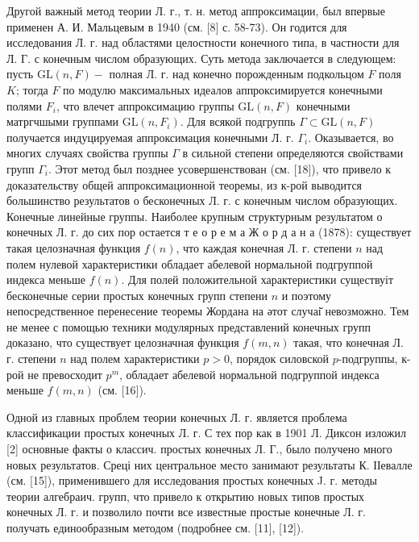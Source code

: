 \documentclass[10pt]{article}
\begin{document}
Другой важный метод теории Л. г., т. н. метод аппроксимации, был впервые применен А. И. Мальцевым в 1940 (см. [8] с. 58-73). Он годится для исследования Л. г. над областями целостности конечного типа, в частности для Л. Г. с конечным числом образующих. Суть метода заключается в следующем: пусть $\mathrm{GL}(n, F)-$ полная Л. г. над конечно порожденным подкольцом $F$ поля $K$; тогда $F$ по модулю максимальных идеалов аппроксимируется конечными полями $F_{i}$, что влечет аппроксимацию группы $\mathrm{GL}(n, F)$ конечными матргчшыми группами $\mathrm{GL}\left(n, F_{i}\right)$. Для всякой подгруппь $\Gamma \subset \mathrm{GL}(n, F)$ получается индуцируемая аппроксимация конечными Л. г. $\Gamma_{i}$. Оказывается, во многих случаях свойства группы $\Gamma$ в сильной степени определяются свойствами групп $\Gamma_{i}$. Этот метод был позднее усовершенствован (см. [18]), что привело к доказательству общей аппроксимационной теоремы, из к-рой выводится большинство результатов о бесконечных Л. г. с конечным числом образующих. Конечные линейные группы. Наиболее крупным структурным результатом о конечных Л. г. до сих пор остается т е о р е м а Ж о р д а н а (1878): существует такая целозначная функция $f(n)$, что каждая конечная Л. г. степени $n$ над полем нулевой характеристики обладает абелевой нормальной подгруппой индекса меньше $f(n)$. Для полей положительной характеристики существуіт бесконечные серии простых конечных групп степени $n$ и поэтому непосредственное перенесение теоремы Жордана на әтот случаі̆ невозможно. Тем не менее с помощью техники модулярных представлений конечных групп доказано, что существует целозначная функция $f(m, n)$ такая, что конечная Л. г. степени $n$ над полем характеристики $p>0$, порядок силовской $p$-подгруппы, к-рой не превосходит $p^{m}$, обладает абелевой нормальной подгруппой индекса меньше $f(m, n)$ (см. [16]).



Одной из главных проблем теории конечных Л. г. является проблема классификации простых конечных Л. г. С тех пор как в 1901 Л. Диксон изложил [2] основные факты о классич. простых конечных Л. Г., было получено много новых результатов. Среці них центральное место занимают результаты К. ІІевалле (см. [15]), применившего для исследования простых конечных J. г. методы теории алгебраич. групп, что привело к открытию новых типов простых конечных Л. г. и позволило почти все известные простые конечные Л. г. получать единообразным методом (подробнее см. [11], [12]).
\end{document}
